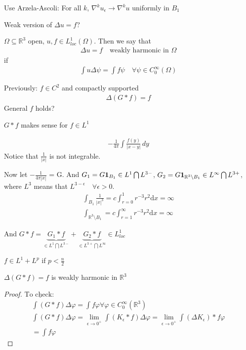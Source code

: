\documentclass[11pt]{article}
\begin{document}
Use Arzela-Ascoli: For all $k$, $\nabla^{k}u_{\epsilon} \longrightarrow \nabla^{k}u$ uniformly in $B_1$

Weak version of $\Delta u = f$?
\begin{definition}
    $\Omega \subseteq \mathbb{R}^{3}$ open, $u,f \in L^{1}_{loc}(\Omega)$. Then we say that
    \begin{align*}
        \Delta u = f \quad \text{weakly harmonic in } \Omega
    \end{align*}
    if 
    \begin{align*}
        \int u \Delta \psi = \int f \psi \quad \forall \psi \in C_{0}^{\infty}(\Omega)
    \end{align*}
\end{definition}

Previously: $f \in C^{2}$ and compactly supported
\begin{align*}
    \Delta(G*f) = f
\end{align*}
General $f$ holds?

\begin{example}
    $G*f$ makes sense for $f \in L^{1}$

    \begin{align*}
        -\frac{1}{4\pi} \int \frac{f(y)}{|x-y|}\, dy
    \end{align*}
    Notice that $\frac{1}{|x|}$ is not integrable.
\end{example}

Now let $-\frac{1}{4\pi|x|}$ = G. And $G_1 = G\bm{1}_{B_1} \in L^{1} \bigcap L^{3-}$, 
$G_2 = G\bm{1}_{\mathbb{R}^{3}\setminus B_1} \in L^{\infty} \bigcap L^{3+}$, 
where $L^{3}$ means that $L^{3-\epsilon} \quad \forall \epsilon > 0$.
\begin{align*}
    \int_{B_1}\frac{1}{|x|^{3}} = c\int_{r=0}^{1} r^{-3}r^{2}  \mathrm{d}x = \infty\\
    \int_{\mathbb{R}^{3}\setminus B_1} = c \int_{r=1}^{\infty} r^{-3}r^{2}  \mathrm{d}x = \infty
\end{align*}


And $G*f =  \underbrace{G_1*f}_{\in L^{1} \bigcap L^{3-}}  + \underbrace{ G_2*f}_{\in
L^{3+}\bigcap L^{\infty}} \in L_{loc}^{1}$
\begin{exercise}
    $f \in L^{1} + L^{p}$ if $p < \frac{n}{2}$
\end{exercise}

\begin{claim}
    $\Delta(G*f) = f$ is weakly harmonic in $\mathbb{R}^{3}$
\end{claim}
\begin{proof}
    $\underline{\text{To check: }}$
    \begin{align*}
        \int(G*f)\Delta \varphi = \int f \varphi \forall \varphi \in C_{0}^{\infty}(\mathbb{R}^{3})\\
        \int(G*f)\Delta \varphi = \lim_{\epsilon \to 0^{+}}\int(K_{\epsilon}*f)\Delta \varphi = 
        \lim_{\epsilon \to 0^{+}} \int (\Delta K_{\epsilon}) * f \varphi\\
        = \int f \varphi
    \end{align*}
\end{proof}
\end{document}
